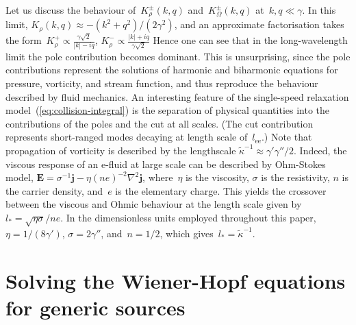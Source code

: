 \documentclass[preprint,aps,eqsecnum, prb]{revtex4-1}
\newcommand{\fplus}[1]{{#1}^{+}}
\newcommand{\fminus}[1]{{#1}^{-}}
\newcommand{\fplusminus}[1]{{#1}^{\pm}}
\begin{document}
Let us discuss the behaviour of~$\fplusminus{K}_\rho(k, q)$
and~$\fplusminus{K}_\Omega(k, q)$ at~$k, q \ll \gamma$. In this limit,
$K_\rho(k, q)  \approx -  (k^2 + q^2)/(2\gamma^2)$, and an approximate
factorisation takes
the form~$\fplus{K}_\rho \propto \frac{\gamma \sqrt{2}}{|k| - i q}$,
$\fminus{K}_\rho \propto \frac{|k| + i q}{\gamma \sqrt{2}}$
Hence one can see that in the
long-wavelength limit the pole contribution becomes dominant.
This is unsurprising,
since the pole contributions
represent the solutions of harmonic and biharmonic equations for
pressure, vorticity, and stream function, and thus reproduce
the behaviour described by fluid mechanics. An interesting feature
of the single-speed relaxation model~(\ref{eq:collision-integral}) is the
separation of physical quantities into the contributions of the
poles and the cut at all scales. (The cut contribution represents
short-ranged modes decaying at length scale of~$l_\mathrm{ee}$.)
Note that propagation of vorticity is described by the lengthscale
${\tilde \kappa}^{-1} \approx \gamma' \gamma'' / 2$. Indeed, the viscous
response of an e-fluid at large scale can be described by Ohm-Stokes model,
${\bm E} = \sigma^{-1}  {\bm j} - \eta (ne)^{-2} \nabla^2 {\bm j}$,
where~$\eta$ is the viscosity, $\sigma$ is the resistivity, $n$
is the carrier density, and~$e$ is the elementary charge.
This yields
the  crossover between the viscous and Ohmic behaviour at the
length scale given
by~$l_\ast = \sqrt{\eta \sigma} / ne$. In the dimensionless units
employed throughout this paper,
$\eta = 1/(8 \gamma')$, $\sigma = 2\gamma''$, and~$n = 1/2$, which
gives~$l_\ast = {\tilde \kappa}^{-1}$.

\section{Solving the Wiener-Hopf equations for generic sources}
\label{sec:wh-solution}
\end{document}
